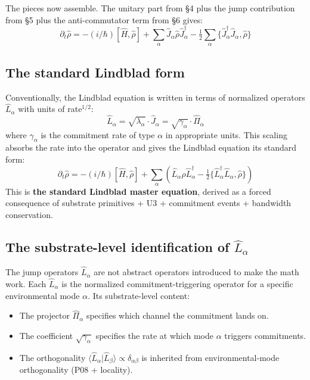 \documentclass[11pt,a4paper]{article}
\begin{document}
The pieces now assemble. The unitary part from \S4 plus the jump contribution from \S5 plus the anti-commutator term from \S6 gives:
\[
\partial_t\hat\rho = -(i/\hbar)[\hat H, \hat\rho] + \sum_\alpha\hat J_\alpha\hat\rho\hat J_\alpha^\dagger - \tfrac{1}{2}\sum_\alpha\{\hat J_\alpha^\dagger\hat J_\alpha, \hat\rho\}
\]

\subsection{The standard Lindblad form}

Conventionally, the Lindblad equation is written in terms of normalized operators $\hat L_\alpha$ with units of rate$^{1/2}$:
\[
\hat L_\alpha = \sqrt{\lambda_\alpha}\cdot\hat J_\alpha = \sqrt{\gamma_\alpha}\cdot\hat\Pi_\alpha
\]
where $\gamma_\alpha$ is the commitment rate of type $\alpha$ in appropriate units. This scaling absorbs the rate into the operator and gives the Lindblad equation its standard form:
\[
\partial_t\hat\rho = -(i/\hbar)[\hat H, \hat\rho] + \sum_\alpha\left(\hat L_\alpha\hat\rho\hat L_\alpha^\dagger - \tfrac{1}{2}\{\hat L_\alpha^\dagger\hat L_\alpha, \hat\rho\}\right)
\]
This is \textbf{the standard Lindblad master equation}, derived as a forced consequence of substrate primitives + U3 + commitment events + bandwidth conservation.

\subsection{The substrate-level identification of $\hat L_\alpha$}

The jump operators $\hat L_\alpha$ are not abstract operators introduced to make the math work. Each $\hat L_\alpha$ is the normalized commitment-triggering operator for a specific environmental mode $\alpha$. Its substrate-level content:

\begin{itemize}[noitemsep]
  \item The projector $\hat\Pi_\alpha$ specifies which channel the commitment lands on.
  \item The coefficient $\sqrt{\gamma_\alpha}$ specifies the rate at which mode $\alpha$ triggers commitments.
  \item The orthogonality $\langle\hat L_\alpha|\hat L_\beta\rangle \propto \delta_{\alpha\beta}$ is inherited from environmental-mode orthogonality (P08 + locality).
\end{itemize}
\end{document}
